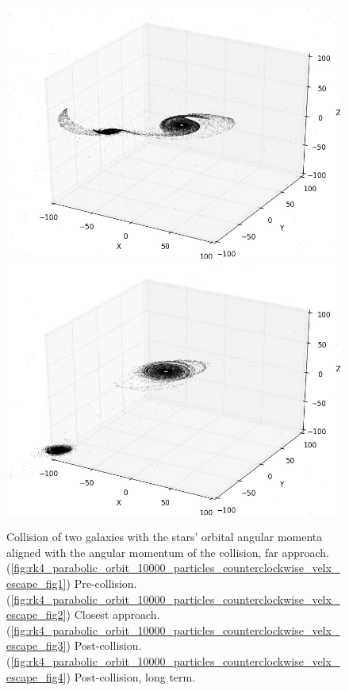 \documentclass[10pt,letterpaper]{article}
\begin{document}
\begin{figure}[!htb]
  \includegraphics[width=\linewidth]{figures/galaxy_collisions/rk4_parabolic_orbit_10000_particles_counterclockwise_velx_escape_fig3.png}
  \subcaption{}\label{fig:rk4_parabolic_orbit_10000_particles_counterclockwise_velx_escape_fig3}
\endminipage
{}%
  \includegraphics[width=\linewidth]{figures/galaxy_collisions/rk4_parabolic_orbit_10000_particles_counterclockwise_velx_escape_fig4.png}
  \subcaption{}\label{fig:rk4_parabolic_orbit_10000_particles_counterclockwise_velx_escape_fig4}
\endminipage
\caption{Collision of two galaxies with the stars' orbital angular momenta aligned with the angular momentum of the collision, far approach. (\ref{fig:rk4_parabolic_orbit_10000_particles_counterclockwise_velx_escape_fig1}) Pre-collision. (\ref{fig:rk4_parabolic_orbit_10000_particles_counterclockwise_velx_escape_fig2}) Closest approach. (\ref{fig:rk4_parabolic_orbit_10000_particles_counterclockwise_velx_escape_fig3}) Post-collision. (\ref{fig:rk4_parabolic_orbit_10000_particles_counterclockwise_velx_escape_fig4})
Post-collision, long term.}\label{fig:rk4_parabolic_orbit_10000_particles_counterclockwise_velx_escape}
\end{figure}
\end{document}
